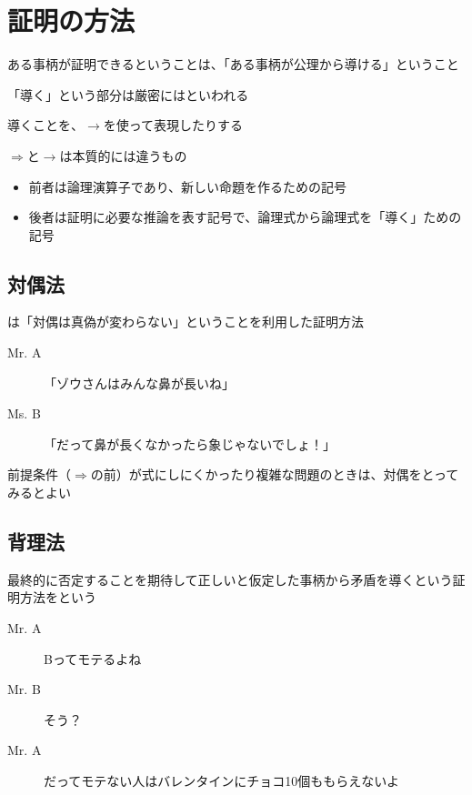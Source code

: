 \documentclass[../book_need-set-theory]{subfiles}
\begin{document}
\section{証明の方法}

ある事柄が証明できるということは、「ある事柄が公理から導ける」ということ

「導く」という部分は厳密にはといわれる

\br

導くことを、$\rightarrow $を使って表現したりする

$\Rightarrow$と$\rightarrow$は本質的には違うもの

\begin{itemize}
  \item 前者は論理演算子であり、新しい命題を作るための記号
  \item 後者は証明に必要な推論を表す記号で、論理式から論理式を「導く」ための記号
\end{itemize}

\sectionline
\subsection{対偶法}

は「対偶は真偽が変わらない」ということを利用した証明方法

\begin{description}
  \item[Mr. A] 「ゾウさんはみんな鼻が長いね」
  \item[Ms. B] 「だって鼻が長くなかったら象じゃないでしょ！」
\end{description}

前提条件（$\Rightarrow$の前）が式にしにくかったり複雑な問題のときは、対偶をとってみるとよい

\sectionline
\subsection{背理法}

最終的に否定することを期待して正しいと仮定した事柄から矛盾を導くという証明方法をという

\begin{description}
  \item[Mr. A] Bってモテるよね
  \item[Mr. B] そう？
  \item[Mr. A] だってモテない人はバレンタインにチョコ10個ももらえないよ
\end{description}
\end{document}
